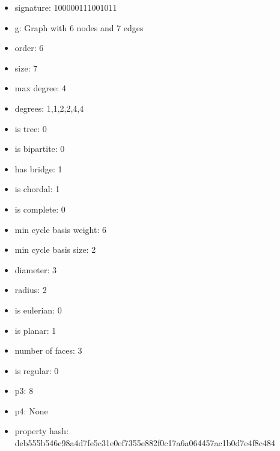 \begin{itemize}
\item signature: 100000111001011
\item g: Graph with 6 nodes and 7 edges
\item order: 6
\item size: 7
\item max degree: 4
\item degrees: 1,1,2,2,4,4
\item is tree: 0
\item is bipartite: 0
\item has bridge: 1
\item is chordal: 1
\item is complete: 0
\item min cycle basis weight: 6
\item min cycle basis size: 2
\item diameter: 3
\item radius: 2
\item is eulerian: 0
\item is planar: 1
\item number of faces: 3
\item is regular: 0
\item p3: 8
\item p4: None
\item property hash: deb555b546c98a4d7fe5c31e0ef7355e882f0c17a6a064457ac1b0d7e4f8c484
\end{itemize}
\newpage
\begin{figure}
\end{figure}
